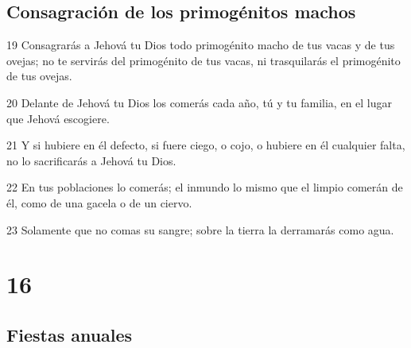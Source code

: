 \section{Consagración de los primogénitos machos}

\par 19 Consagrarás a Jehová tu Dios todo primogénito macho de tus vacas y de tus ovejas; no te servirás del primogénito de tus vacas, ni trasquilarás el primogénito de tus ovejas.
\par 20 Delante de Jehová tu Dios los comerás cada año, tú y tu familia, en el lugar que Jehová escogiere.
\par 21 Y si hubiere en él defecto, si fuere ciego, o cojo, o hubiere en él cualquier falta, no lo sacrificarás a Jehová tu Dios.
\par 22 En tus poblaciones lo comerás; el inmundo lo mismo que el limpio comerán de él, como de una gacela o de un ciervo.
\par 23 Solamente que no comas su sangre; sobre la tierra la derramarás como agua.

\chapter{16}

\section{Fiestas anuales }

